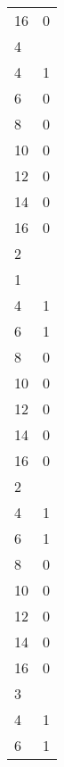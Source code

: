 \documentclass{article}
\begin{document}
\begin{table}[]
\begin{tabular}{ll}
16                                         & 0 \\
4                                          &   \\
4                                          & 1 \\
6                                          & 0 \\
8                                          & 0 \\
10                                         & 0 \\
12                                         & 0 \\
14                                         & 0 \\
16                                         & 0 \\
2                                          &   \\
1                                          &   \\
4                                          & 1 \\
6                                          & 1 \\
8                                          & 0 \\
10                                         & 0 \\
12                                         & 0 \\
14                                         & 0 \\
16                                         & 0 \\
2                                          &   \\
4                                          & 1 \\
6                                          & 1 \\
8                                          & 0 \\
10                                         & 0 \\
12                                         & 0 \\
14                                         & 0 \\
16                                         & 0 \\
3                                          &   \\
4                                          & 1 \\
6                                          & 1 \\

\end{tabular}
\end{table}
\end{document}
